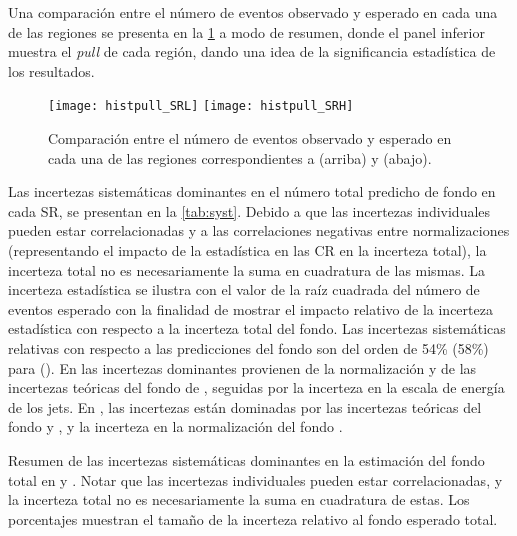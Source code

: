 Una comparación entre el número de eventos observado y esperado en cada una de las
regiones se presenta en la \cref{fig:fit_region_composition} a modo de resumen, donde
el panel inferior muestra el \emph{pull} de cada región, dando una idea de la significancia
estadística de los resultados.


\begin{figure}[!htbp]
  \centering

  \texttt{[image: histpull\_SRL]}
  \texttt{[image: histpull\_SRH]}

  \caption{Comparación entre el número de eventos observado y esperado en cada
    una de las regiones correspondientes a {\SRL} (arriba) y {\SRH} (abajo).}

  \label{fig:fit_region_composition}

\end{figure}


Las incertezas sistemáticas dominantes en el número total predicho de fondo en
cada SR, se presentan en la \cref{tab:syst}.
Debido a que las incertezas individuales pueden estar correlacionadas y a las
correlaciones negativas entre normalizaciones (representando el impacto de la
estadística en las CR en la incerteza total), la incerteza total no es
necesariamente la suma en cuadratura de las mismas. La incerteza estadística se
ilustra con el valor de la raíz cuadrada del número de eventos esperado con la
finalidad de mostrar el impacto relativo de la incerteza estadística con
respecto a la incerteza total del fondo. Las incertezas sistemáticas relativas
con respecto a las predicciones del fondo son del orden de 54\% (58\%) para
{\SRL} (\SRH). En {\SRL} las incertezas dominantes provienen de la normalización
y de las incertezas teóricas del fondo de {\ttgam}, seguidas por la incerteza en
la escala de energía de los jets. En {\SRH}, las
incertezas están dominadas por las incertezas teóricas del fondo {\zgam} y
{\gjet}, y la incerteza en la normalización del fondo {\wgam}.


\begin{table}[!htb]
  \centering

  \caption{Resumen de las incertezas sistemáticas dominantes en la estimación del fondo total
    en {\SRL} y {\SRH}. Notar que las incertezas individuales pueden estar correlacionadas, y la incerteza
    total no es necesariamente la suma en cuadratura de estas. Los porcentajes muestran el tamaño
    de la incerteza relativo al fondo esperado total.}
  \label{tab:syst}

  
\end{table}



